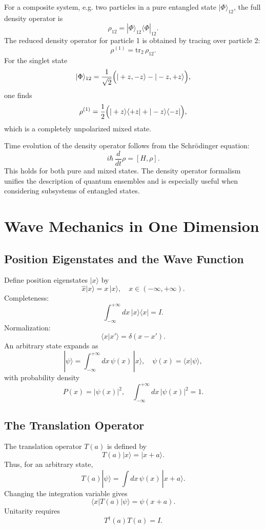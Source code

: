 \documentclass[twocolumn]{article}
\begin{document}
\begin{spacing}{1}
For a composite system, e.g. two particles in a pure entangled state \( |\Phi\rangle_{12} \), the full density operator is
\[
\rho_{12}=|\Phi\rangle_{12}\langle\Phi|_{12}.
\]
The reduced density operator for particle 1 is obtained by tracing over particle 2:
\[
\rho^{(1)}=\mathrm{tr}_2\,\rho_{12}.
\]
For the singlet state
\[
|\Phi\rangle_{12}=\frac{1}{\sqrt{2}}\Bigl(|+z,-z\rangle - |-z,+z\rangle\Bigr),
\]
one finds
\[
\rho^{(1)}=\frac{1}{2}\Bigl(|+z\rangle\langle+z|+|-z\rangle\langle-z|\Bigr),
\]
which is a completely unpolarized mixed state.
\medskip

Time evolution of the density operator follows from the Schrödinger equation:
\[
i\hbar\,\frac{d}{dt}\rho=[H,\rho].
\]
This holds for both pure and mixed states. The density operator formalism unifies the description of quantum ensembles and is especially useful when considering subsystems of entangled states.

\section{Wave Mechanics in One Dimension}

\subsection{Position Eigenstates and the Wave Function}
Define position eigenstates \(|x\rangle\) by 
\[
\hat{x}|x\rangle = x\,|x\rangle,\quad x\in(-\infty,+\infty).
\]
Completeness:
\[
\int_{-\infty}^{+\infty}dx\,|x\rangle\langle x| = I.
\]
Normalization:
\[
\langle x|x'\rangle = \delta(x-x').
\]
An arbitrary state expands as
\[
|\psi\rangle = \int_{-\infty}^{+\infty}dx\,\psi(x)\,|x\rangle,\quad \psi(x)=\langle x|\psi\rangle,
\]
with probability density
\[
P(x)=|\psi(x)|^2,\quad \int_{-\infty}^{+\infty}dx\,|\psi(x)|^2=1.
\]

\subsection{The Translation Operator}
The translation operator \(T(a)\) is defined by
\[
T(a)|x\rangle = |x+a\rangle.
\]
Thus, for an arbitrary state,
\[
T(a)|\psi\rangle = \int dx\,\psi(x)\,|x+a\rangle.
\]
Changing the integration variable gives
\[
\langle x|T(a)|\psi\rangle = \psi(x+a).
\]
Unitarity requires
\[
T^\dagger(a)T(a)=I.
\]


\end{spacing}
\end{document}
